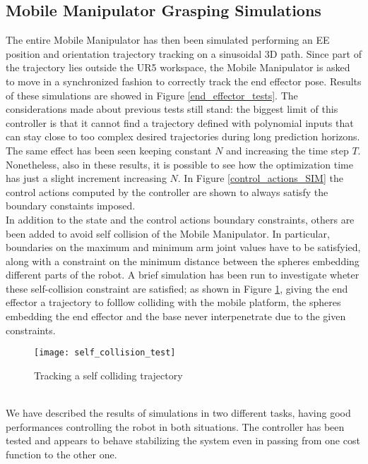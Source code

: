 \subsection{Mobile Manipulator Grasping Simulations}
The entire Mobile Manipulator has then been simulated performing an EE position and orientation trajectory tracking on a sinusoidal 3D path. Since part of the trajectory lies outside the UR5 workspace, the Mobile Manipulator is asked to move in a synchronized fashion to correctly track the end effector pose. 
Results of these simulations are showed in Figure \ref{end_effector_tests}. The considerations made about previous tests still stand: the biggest limit of this controller is that it cannot find a trajectory defined with polynomial inputs that can stay close to too complex desired trajectories during long prediction horizons. The same effect has been seen keeping constant $N$ and increasing the time step $T$. Nonetheless, also in these results, it is possible to see how the optimization time has just a slight increment increasing $N$. In Figure \ref{control_actions_SIM} the control actions computed by the controller are shown to always satisfy the boundary constaints imposed.\\
In addition to the state and the control actions boundary constraints, others are been added to avoid self collision of the Mobile Manipulator. In particular, boundaries on the maximum and minimum arm joint values have to be satisfyied, along with a constraint on the minimum distance between the spheres embedding different parts of the robot. A brief simulation has been run to investigate wheter these self-collision constraint are satisfied; as shown in Figure \ref{self_collision}, giving the end effector a trajectory to folllow colliding with the mobile platform, the spheres embedding the end effector and the base never interpenetrate due to the given constraints.
\begin{figure}[t]
\centering
\texttt{[image: self\_collision\_test]}
\caption{Tracking a self colliding trajectory}
\label{self_collision}
\end{figure}
\\
We have described the results of simulations in two different tasks, having good performances controlling the robot in both situations. The controller has been tested and appears to behave stabilizing the system even in passing from one cost function to the other one.
